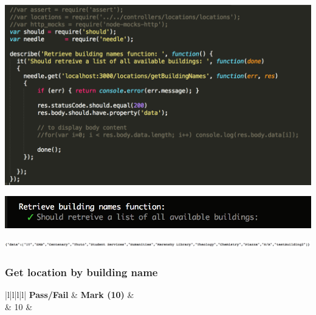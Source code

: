 \documentclass[runningheads,a4paper]{article}
\newcommand{\cmark}{\ding{51}}%
\begin{document}
	\begin{center}
		\begin{minipage}{0.48\linewidth}
			\includegraphics[width=\linewidth]{fig/buildingSearch.png}
		\end{minipage}
		\hfill
		\begin{minipage}{0.49\linewidth}
			\includegraphics[width=\linewidth]{fig/ReqBuildAll.png}
		\end{minipage}
		\begin{minipage}{1.0\linewidth}
			\includegraphics[width=\linewidth]{fig/buildalldata.png}
		\end{minipage}
	\end{center}
	
	
	
	
	\subsubsection{Get location by building name}
	\begin{tabular}{|l|l|l|l|}
		\hline
		\textbf{Pass/Fail} & \textbf{Mark (10)} &                                                                                                                                                               \\ 
		\hline
		\cmark  &  10 &  \\ \hline
	\end{tabular}
	
\end{document}
